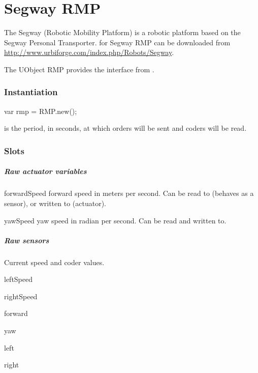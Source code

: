 
\chapter{Segway RMP}
\label{sec:segway-rmp}

The Segway  (Robotic Mobility Platform) is a robotic platform based
on the Segway Personal Transporter.  \urbi for Segway RMP can be downloaded
from \url{http://www.urbiforge.com/index.php/Robots/Segway}.

The UObject RMP provides the interface from \urbi.

\subsection{Instantiation}

\begin{urbiunchecked}
var rmp = RMP.new();
\end{urbiunchecked}

 is the period, in seconds, at which orders will be sent and
coders will be read.

\subsection{Slots}

\paragraph{Raw actuator variables}

\begin{urbiscriptapi}
\item[forwardSpeed] forward speed in meters per second.  Can be read to
  (behaves as a sensor), or written to (actuator).
\item[yawSpeed] yaw speed in radian per second.  Can be read and written
  to.
\end{urbiscriptapi}

\paragraph{Raw sensors}
Current speed and coder values.
\begin{urbiscriptapi}
\item[leftSpeed]
\item[rightSpeed]
\item[forward]
\item[yaw]
\item[left]
\item[right]
\end{urbiscriptapi}

